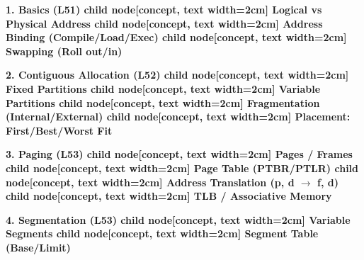 \documentclass[11pt]{article}
\begin{document}
\begin{popfigure}
\begin{center}\end{center}
\vspace{-2pt}
\begin{tcbraster}[raster columns=3,raster equal height=rows,raster column skip=6pt,raster row skip=6pt,enhanced,blankest]
\begin{tcolorbox}[enhanced,colback=popblue,colframe=popblue,coltext=white,boxrule=0.9pt,arc=3pt,left=4pt,right=4pt,top=3pt,bottom=3pt,boxsep=1pt,halign=left]\bfseries\scriptsize 1. Basics (L51)
        child {node[concept, text width=2cm] {Logical vs Physical Address}}
        child {node[concept, text width=2cm] {Address Binding (Compile/Load/Exec)}}
        child {node[concept, text width=2cm] {Swapping (Roll out/in)}}\end{tcolorbox}
\begin{tcolorbox}[enhanced,colback=poporange,colframe=poporange,coltext=white,boxrule=0.9pt,arc=3pt,left=4pt,right=4pt,top=3pt,bottom=3pt,boxsep=1pt,halign=left]\bfseries\scriptsize 2. Contiguous Allocation (L52)
        child {node[concept, text width=2cm] {Fixed Partitions}}
        child {node[concept, text width=2cm] {Variable Partitions}}
        child {node[concept, text width=2cm] {Fragmentation (Internal/External)}}
        child {node[concept, text width=2cm] {Placement: First/Best/Worst Fit}}\end{tcolorbox}
\begin{tcolorbox}[enhanced,colback=popgreen,colframe=popgreen,coltext=white,boxrule=0.9pt,arc=3pt,left=4pt,right=4pt,top=3pt,bottom=3pt,boxsep=1pt,halign=left]\bfseries\scriptsize 3. Paging (L53)
        child {node[concept, text width=2cm] {Pages / Frames}}
        child {node[concept, text width=2cm] {Page Table (PTBR/PTLR)}}
        child {node[concept, text width=2cm] {Address Translation (p, d $\to$ f, d)}}
        child {node[concept, text width=2cm] {TLB / Associative Memory}}\end{tcolorbox}
\begin{tcolorbox}[enhanced,colback=poppurple,colframe=poppurple,coltext=white,boxrule=0.9pt,arc=3pt,left=4pt,right=4pt,top=3pt,bottom=3pt,boxsep=1pt,halign=left]\bfseries\scriptsize 4. Segmentation (L53)
        child {node[concept, text width=2cm] {Variable Segments}}
        child {node[concept, text width=2cm] {Segment Table (Base/Limit)}}

\end{tcolorbox}
\end{tcbraster}
\end{popfigure}
\end{document}
